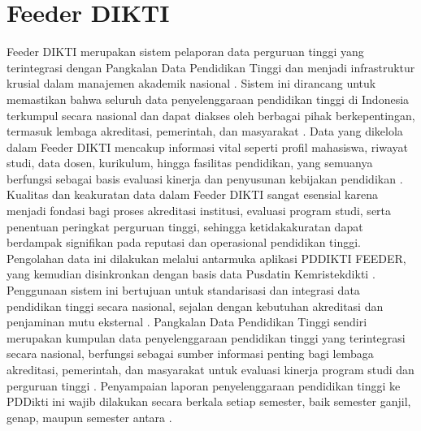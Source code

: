 \documentclass[12pt,a4paper,oneside]{report}
\begin{document}
        \section{Feeder DIKTI}
        Feeder DIKTI merupakan sistem pelaporan data perguruan tinggi yang terintegrasi dengan Pangkalan Data Pendidikan Tinggi dan menjadi infrastruktur krusial dalam manajemen akademik nasional  \parencite{international_journal_of_evaluation_and_research_in_education__ijere__f1437b0d}.
        Sistem ini dirancang untuk memastikan bahwa seluruh data penyelenggaraan pendidikan tinggi di Indonesia terkumpul secara nasional dan dapat diakses oleh berbagai pihak berkepentingan, termasuk lembaga akreditasi, pemerintah, dan masyarakat  \parencite{ngatmari_ngatmari_87a9f833}  \parencite{peraturan_menteri_pendidikan_tinggi__sains__dan_teknologi_tentang_penjaminan_mutu_pendidikan_tinggi_4712741f}.
        Data yang dikelola dalam Feeder DIKTI mencakup informasi vital seperti profil mahasiswa, riwayat studi, data dosen, kurikulum, hingga fasilitas pendidikan, yang semuanya berfungsi sebagai basis evaluasi kinerja dan penyusunan kebijakan pendidikan  \parencite{ariana_yunita_b139140c}.
        Kualitas dan keakuratan data dalam Feeder DIKTI sangat esensial karena menjadi fondasi bagi proses akreditasi institusi, evaluasi program studi, serta penentuan peringkat perguruan tinggi, sehingga ketidakakuratan dapat berdampak signifikan pada reputasi dan operasional pendidikan tinggi.
        Pengolahan data ini dilakukan melalui antarmuka aplikasi PDDIKTI FEEDER, yang kemudian disinkronkan dengan basis data Pusdatin Kemristekdikti  \parencite{ngatmari_ngatmari_87a9f833}. Penggunaan sistem ini bertujuan untuk standarisasi dan integrasi data pendidikan tinggi secara nasional, sejalan dengan kebutuhan akreditasi dan penjaminan mutu eksternal  \parencite{menteri_pendidikan_fd83efd6}.
        Pangkalan Data Pendidikan Tinggi sendiri merupakan kumpulan data penyelenggaraan pendidikan tinggi yang terintegrasi secara nasional, berfungsi sebagai sumber informasi penting bagi lembaga akreditasi, pemerintah, dan masyarakat untuk evaluasi kinerja program studi dan perguruan tinggi  \parencite{undang_undang_republik_indonesia_nomor_12_tahun_2012_tentang_pendidikan_tinggi_5e8158d0}.
        Penyampaian laporan penyelenggaraan pendidikan tinggi ke PDDikti ini wajib dilakukan secara berkala setiap semester, baik semester ganjil, genap, maupun semester antara  \parencite{muhadi_hariyanto_3071c01e}. 
\end{document}

